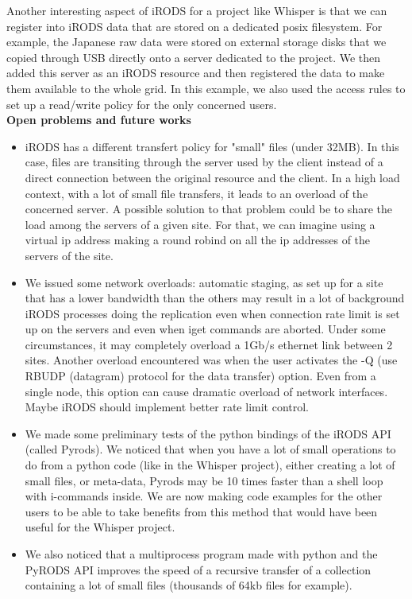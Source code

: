 \documentclass[a4paper, 10pt]{article}
\begin{document}
\begin{multicols}{2}
Another interesting aspect of iRODS for a project like Whisper is that we can register into iRODS data that are stored on a dedicated posix filesystem. For example, the Japanese raw data were stored on external storage disks that we copied through USB directly onto a server dedicated to the project. We then added this server as an iRODS resource and then registered the data to make them available to the whole grid. In this example, we also used the access rules to set up a read/write policy for the only concerned users.
\\
\textbf{Open problems and future works}

\begin{itemize}
  \item iRODS has a different transfert policy for "small" files (under 32MB). In this case, files are transiting through the server used by the client instead of a direct connection between the original resource and the client. In a high load context, with a lot of small file transfers, it leads to an overload of the concerned server. A possible solution to that problem could be to share the load among the servers of a given site. For that, we can imagine using a virtual ip address making a round robind on all the ip addresses of the servers of the site.
  \item We issued some network overloads: automatic staging, as set up for a site that has a lower bandwidth than the others may result in a lot of background iRODS processes doing the replication even when connection rate limit is set up on the servers and even when iget commands are aborted. Under some circumstances, it may completely overload a 1Gb/s ethernet link between 2 sites. Another overload encountered was when the user activates the -Q (use RBUDP (datagram) protocol for the data transfer) option. Even from a single node, this option can cause dramatic overload of network interfaces. Maybe iRODS should implement better rate limit control. 
  \item We made some preliminary tests of the python bindings of the iRODS API (called Pyrods). We noticed that when you have a lot of small operations to do from a python code (like in the Whisper project), either creating a lot of small files, or meta-data, Pyrods may be 10 times faster than a shell loop with i-commands inside. We are now making code examples for the other users to be able to take benefits from this method that would have been useful for the Whisper project.
  \item We also noticed that a multiprocess program made with python and the PyRODS API improves the speed of a recursive transfer of a collection containing a lot of small files (thousands of 64kb files for example).
\end{itemize}


\end{multicols}
\end{document}
